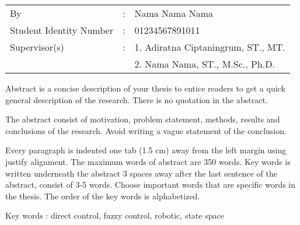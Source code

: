 
\begin{tabular}{lcl}
By &:& Nama Nama Nama\\
Student Identity Number &:& 01234567891011\\
Supervisor(s) &:& 1. Adiratna Ciptaningrum, ST., MT.\\
& & 2. Nama Nama, ST., M.Sc., Ph.D.\\
\end{tabular}

\vspace{1ex}


Abstract is a concise description of your thesis to entice readers to get a quick general description of the research. There is no quotation in the abstract. 

The abstract consist of motivation, problem statement, methods, results and conclusions of the research. Avoid writing a vague statement of the conclusion.

Every paragraph is indented one tab (1.5 cm) away from the left margin using justify alignment. The maximum words of abstract are 350 words. Key words is written underneath the abstract 3 spaces away after the last sentence of the abstract, consist of 3-5 words. Choose important words that are specific words in the thesis. The order of the key words is alphabetized.

\vspace{6ex}

\noindent Key words : direct control, fuzzy control, robotic, state space